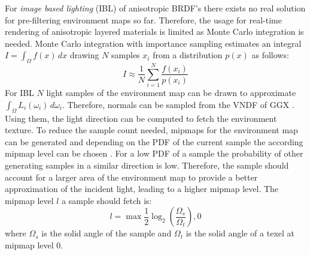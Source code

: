 For \textit{image based lighting} (IBL) of anisotropic BRDF's there exists no real solution for pre-filtering environment maps so far. Therefore, the usage for real-time rendering of anisotropic layered materials is limited as Monte Carlo integration is needed. Monte Carlo integration with importance sampling estimates an integral $I = \int_\Omega f(x) \,dx$ drawing $N$ samples $x_i$ from a distribution $p(x)$ as follows:
\begin{equation}
    I \approx \frac{1}{N} \sum_{i=1}^{N} \frac{f(x_i)}{p(x_i)}
\end{equation}
For IBL $N$ light samples of the environment map can be drawn to approximate $\int_{\Omega} L_i(\omega_i) \,d\omega_i$. Therefore, normals can be sampled from the VNDF of GGX \parencite{heitz2018}. Using them, the light direction can be computed to fetch the environment texture. To reduce the sample count needed, mipmaps for the environment map can be generated and depending on the PDF of the current sample the according mipmap level can be chosen \parencite{nguyen2007}. For a low PDF of a sample the probability of other generating samples in a similar direction is low. Therefore, the sample should account for a larger area of the environment map to provide a better approximation of the incident light, leading to a higher mipmap level. The mipmap level $l$ a sample should fetch is:
\begin{equation}
    l = \max{\frac{1}{2} \log_2{\left(\frac{\Omega_s}{\Omega_t}\right)},0}
\end{equation}
where $\Omega_s$ is the solid angle of the sample and $\Omega_t$ is the solid angle of a texel at mipmap level 0.